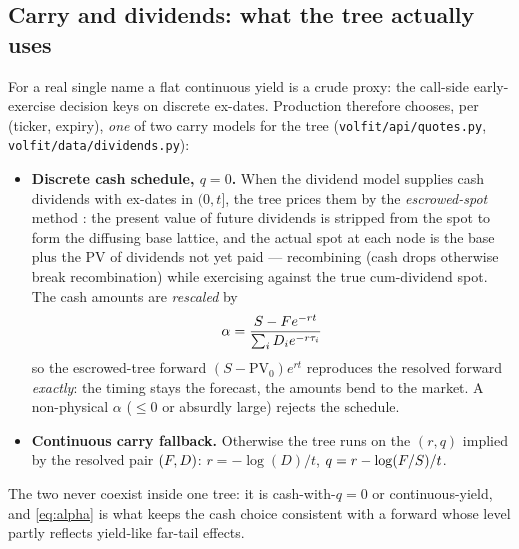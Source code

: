 \documentclass[11pt]{article}
\begin{document}
\subsection{Carry and dividends: what the tree actually uses}
\label{sec:carry}

For a real single name a flat continuous yield is a crude proxy: the call-side
early-exercise decision keys on discrete ex-dates. Production therefore chooses,
per (ticker, expiry), \emph{one} of two carry models for the tree
(\texttt{volfit/api/quotes.py}, \texttt{volfit/data/dividends.py}):

\begin{itemize}[leftmargin=1.6em]
\item \textbf{Discrete cash schedule, $q=0$.} When the dividend model supplies
cash dividends with ex-dates in $(0,t]$, the tree prices them by the
\emph{escrowed-spot} method \cite{Hull2018}: the present value of future
dividends is stripped from the spot to form the diffusing base lattice, and the
actual spot at each node is the base plus the PV of dividends not yet paid ---
recombining (cash drops otherwise break recombination) while exercising against
the true cum-dividend spot. The cash amounts are \emph{rescaled} by
\begin{equation}
\alpha=\frac{S-F e^{-rt}}{\sum_i D_i e^{-r\tau_i}}
\label{eq:alpha}
\end{equation}
so the escrowed-tree forward $(S-\mathrm{PV}_0)e^{rt}$ reproduces the resolved
forward \emph{exactly}: the timing stays the forecast, the amounts bend to the
market. A non-physical $\alpha$ ($\le0$ or absurdly large) rejects the schedule.
\item \textbf{Continuous carry fallback.} Otherwise the tree runs on the
$(r,q)$ implied by the resolved pair $(F,D)$: $r=-\log(D)/t$,
$q=r-\log(F/S)/t$.
\end{itemize}

The two never coexist inside one tree: it is cash-with-$q{=}0$ or
continuous-yield, and \cref{eq:alpha} is what keeps the cash choice consistent
with a forward whose level partly reflects yield-like far-tail effects.
\end{document}
